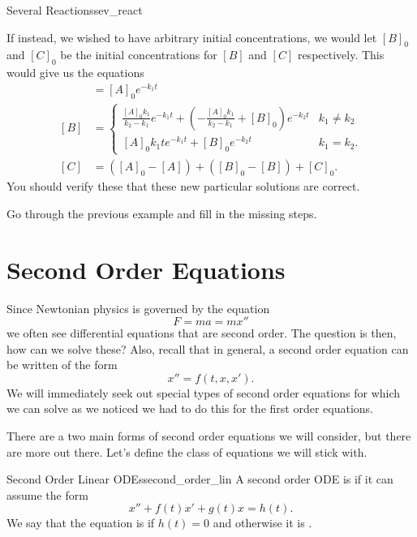 \begin{ex}{Several Reactions}{sev_react}
\begin{figure}[H]
        \end{figure}

        If instead, we wished to have arbitrary initial concentrations, we would let $[B]_0$ and $[C]_0$ be the initial concentrations for $[B]$ and $[C]$ respectively.  This would give us the equations
        \begin{align*}
            [A]&=[A]_0e^{-k_1t}\\
            [B]&=\begin{cases}
                \frac{[A]_0k_1}{k_2-k_1}e^{-k_1t}+\left( -\frac{[A]_0k_1}{k_2-k_1}+[B]_0\right)e^{-k_2t} & k_1\neq k_2\\
                [A]_0k_1te^{-k_1t}+[B]_0e^{-k_2t} & k_1=k_2.
            \end{cases}\\
            [C]&=([A]_0-[A])+([B]_0-[B])+[C]_0.
        \end{align*}
        You should verify these that these new particular solutions are correct.
        \end{ex}

        \begin{exercise}
        Go through the previous example and fill in the missing steps.
        \end{exercise}

        \section{Second Order Equations}

        Since Newtonian physics is governed by the equation
        \[
        F=ma=mx''
        \]
        we often see differential equations that are second order.  The question is then, how can we solve these?  Also, recall that in general, a second order equation can be written of the form
        \[
            x'' = f(t,x,x').
        \]
        We will immediately seek out special types of second order equations for which we can solve as we noticed we had to do this for the first order equations.

        There are a two main forms of second order equations we will consider, but there are more out there. Let's define the class of equations we will stick with.

        \begin{df}{Second Order Linear ODEs}{second_order_lin}
            A second order ODE is  if it can assume the form
            \[
            x''+f(t)x'+g(t)x=h(t).
            \]
            We say that the equation is  if $h(t)=0$ and otherwise it is .
        \end{df}

